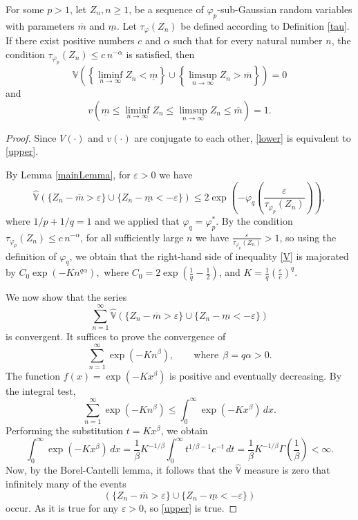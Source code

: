 \documentclass[10pt,a4paper]{amsart}
\def\Vh{{\hat{\mathbb{V}}}}
\begin{document}
\begin{theorem} \label{MainTheorem}
For some $p>1$, let $Z_n, n\ge1$, be a sequence of  $\varphi_p$-sub-Gaussian random variables with parameters
$\overline{m}$ and $\underline{m}$.
Let $\tau_\varphi(Z_n)$ be defined according to Definition \ref{tau}.
If there exist positive numbers $c$ and $\alpha$ such that for every natural number $n$, 
the condition $\tau_{\varphi_p}\!( Z_n )\le c\, n^{-\alpha}$ is satisfied, then
\begin{equation}
\label{upper}
\Vh\left(
\left\{\liminf_{n\to\infty}{Z_n} < \underline{m}\right\}
\cup
\left\{\limsup_{n\to\infty}{Z_n} > \overline{m}\right\}
\right)
= 0
\end{equation}
and 
\begin{equation}
\label{lower}
v\left(
\underline{m}
\le \liminf_{n\to\infty}{Z_n}
\le \limsup_{n\to\infty}{Z_n}
\le \overline{m}
\right)
= 1.
\end{equation}
\end{theorem}

\begin{proof}
Since $V(\cdot)$ and $v(\cdot)$ are conjugate to each other, \eqref{lower} is equivalent to \eqref{upper}.

By Lemma \ref{mainLemma}, for $\varepsilon>0$ we have
\begin{equation}  \label{V}
\Vh\left( \{ Z_n-\overline{m} > \varepsilon \} \cup \{ Z_n-\underline{m} < -\varepsilon \} \right)  
\le 2 \exp\left(-\varphi_q\left(\frac{\varepsilon}{\tau_{\varphi_p}(Z_n)}\right)\right) ,
\end{equation}
where $1/p+1/q=1$ and we applied that  $\varphi_q=\varphi_p^{*}$.
%
By the condition $\tau_{\varphi_p}\!( Z_n )\le c\, n^{-\alpha}$, 
for all sufficiently large $n$ we have $\frac{\varepsilon}{\tau_{\varphi_p}(Z_n)}>1$, so using the definition of
$\varphi_q$, we obtain that the right-hand side of inequality \eqref{V} is majorated by
$C_0\exp\!\left(-K n^{q\alpha}\right),$ 
where $C_0= 2 \exp\!\left(\frac{1}{q}-\frac{1}{2}\right)$,
and $K=\frac{1}{q}\left(\frac{\varepsilon}{c}\right)^q$.

We now show that the series
\[
\sum_{n=1}^{\infty} \Vh\left( \{ Z_n-\overline{m} > \varepsilon \} \cup \{ Z_n-\underline{m} < -\varepsilon \} \right) 
\]
is convergent. 
It suffices to prove the convergence of
\[
\sum_{n=1}^{\infty}\exp\!\left(-K n^{\beta}\right),
\qquad {\text{where}} \ \ \beta=q\alpha>0.
\]
The function $f(x)=\exp(-Kx^\beta)$ is positive and eventually decreasing.
By the integral test,
\[
\sum_{n=1}^{\infty}\exp(-K n^\beta)
\le
\int_{0}^{\infty}\exp(-Kx^\beta)\,dx.
\]
Performing the substitution $t=Kx^\beta$, we obtain
\[
\int_{0}^{\infty}\exp(-Kx^\beta)\,dx
=
\frac{1}{\beta}K^{-1/\beta}
\int_{0}^{\infty} t^{1/\beta-1}e^{-t}\,dt
=
\frac{1}{\beta}K^{-1/\beta}
\Gamma\!\left(\frac{1}{\beta}\right)
<\infty.
\]
Now, by the Borel-Cantelli lemma, it follows that the $\Vh$ measure is zero that infinitely many of the events
$$
\left( \{ Z_n-\overline{m} > \varepsilon \} \cup \{ Z_n-\underline{m} < -\varepsilon \} \right)
$$
occur.
As it is true for any $\varepsilon>0$, so \eqref{upper} is true.
\end{proof}
\end{document}
